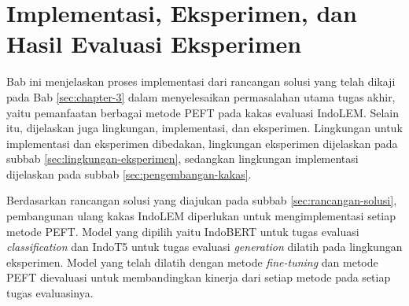 \chapter{Implementasi, Eksperimen, dan Hasil Evaluasi Eksperimen}

Bab ini menjelaskan proses implementasi dari rancangan solusi yang telah dikaji pada Bab \ref{sec:chapter-3} dalam menyelesaikan permasalahan utama tugas akhir, yaitu pemanfaatan berbagai metode PEFT pada kakas evaluasi IndoLEM. Selain itu, dijelaskan juga lingkungan, implementasi, dan eksperimen. Lingkungan untuk implementasi dan eksperimen dibedakan, lingkungan eksperimen dijelaskan pada subbab \ref{sec:lingkungan-eksperimen}, sedangkan lingkungan implementasi dijelaskan pada subbab \ref{sec:pengembangan-kakas}.

Berdasarkan rancangan solusi yang diajukan pada subbab \ref{sec:rancangan-solusi}, pembangunan ulang kakas IndoLEM diperlukan untuk mengimplementasi setiap metode PEFT. Model yang dipilih yaitu IndoBERT untuk tugas evaluasi \textit{classification} dan IndoT5 untuk tugas evaluasi \textit{generation} dilatih pada lingkungan eksperimen. Model yang telah dilatih dengan metode \textit{fine-tuning}  dan metode PEFT dievaluasi untuk membandingkan kinerja dari setiap metode pada setiap tugas evaluasinya.






